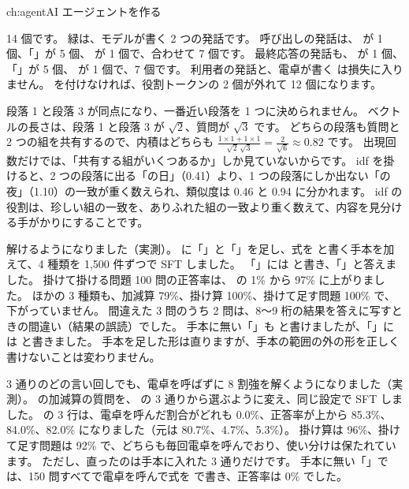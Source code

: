 \begin{answers}{ch:agent}{AI エージェントを作る}
\item 14 個です。
緑は、モデルが書く 2 つの発話です。
呼び出しの発話は、 が 1 個、「」が 5 個、 が 1 個で、合わせて 7 個です。
最終応答の発話も、 が 1 個、「」が 5 個、 が 1 個で、7 個です。
利用者の発話と、電卓が書く  は損失に入りません。
 を付けなければ、役割トークンの 2 個が外れて 12 個になります。
\item 段落 1 と段落 3 が同点になり、一番近い段落を 1 つに決められません。
ベクトルの長さは、段落 1 と段落 3 が $\sqrt2$、質問が $\sqrt3$ です。
どちらの段落も質問と 2 つの組を共有するので、内積はどちらも $\frac{1\times1+1\times1}{\sqrt2\,\sqrt3}=\frac{2}{\sqrt6}\approx0.82$ です。
出現回数だけでは、「共有する組がいくつあるか」しか見ていないからです。
idf を掛けると、2 つの段落に出る「の日」（0.41）より、1 つの段落にしか出ない「の夜」（1.10）の一致が重く数えられ、類似度は 0.46 と 0.94 に分かれます。
idf の役割は、珍しい組の一致を、ありふれた組の一致より重く数えて、内容を見分ける手がかりにすることです。
\item 解けるようになりました（実測）。
 に「」と「」を足し、式を  と書く手本を加えて、4 種類を 1,500 件ずつで SFT しました。
「」には  と書き、「」と答えました。
掛けて掛ける問題 100 問の正答率は、 の 1\% から 97\% に上がりました。
ほかの 3 種類も、加減算 79\%、掛け算 100\%、掛けて足す問題 100\% で、下がっていません。
間違えた 3 問のうち 2 問は、8〜9 桁の結果を答えに写すときの間違い（結果の誤読）でした。
手本に無い「」も  と書けましたが、「」には  と書きました。
手本を足した形は直りますが、手本の範囲の外の形を正しく書けないことは変わりません。
\item 3 通りのどの言い回しでも、電卓を呼ばずに 8 割強を解くようになりました（実測）。
 の加減算の質問を、 の 3 通りから選ぶように変え、同じ設定で SFT しました。
の 3 行は、電卓を呼んだ割合がどれも 0.0\%、正答率が上から 85.3\%、84.0\%、82.0\% になりました（元は 80.7\%、4.7\%、5.3\%）。
掛け算は 96\%、掛けて足す問題は 92\% で、どちらも毎回電卓を呼んでおり、使い分けは保たれています。
ただし、直ったのは手本に入れた 3 通りだけです。
手本に無い「」では、150 問すべてで電卓を呼んで式を \code{*} で書き、正答率は 0\% でした。

\end{answers}
